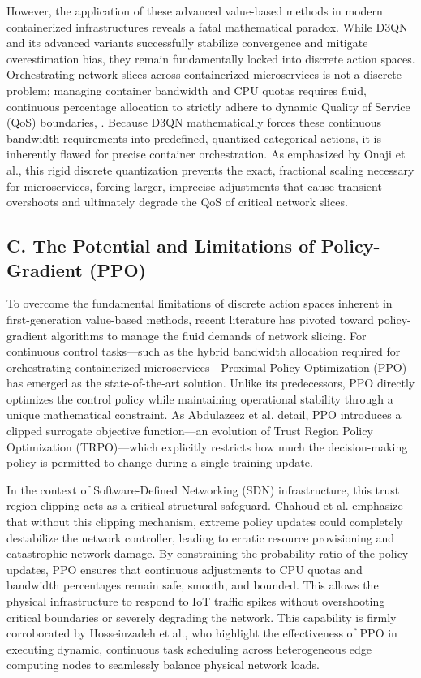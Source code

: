 \documentclass[conference]{IEEEtran}
\begin{document}
However, the application of these advanced value-based methods in modern containerized infrastructures reveals a fatal mathematical paradox. While D3QN and its advanced variants successfully stabilize convergence and mitigate overestimation bias, they remain fundamentally locked into discrete action spaces\cite{b13}. Orchestrating network slices across containerized microservices is not a discrete problem; managing container bandwidth and CPU quotas requires fluid, continuous percentage allocation to strictly adhere to dynamic Quality of Service (QoS) boundaries\cite{b6}, \cite{b35}. Because D3QN mathematically forces these continuous bandwidth requirements into predefined, quantized categorical actions, it is inherently flawed for precise container orchestration\cite{b6}. As emphasized by Onaji et al., this rigid discrete quantization prevents the exact, fractional scaling necessary for microservices, forcing larger, imprecise adjustments that cause transient overshoots and ultimately degrade the QoS of critical network slices\cite{b6}.

\subsection{C. The Potential and Limitations of Policy-Gradient (PPO)}\label{c.-the-potential-and-limitations-of-policy-gradient-ppo}

To overcome the fundamental limitations of discrete action spaces inherent in first-generation value-based methods, recent literature has pivoted toward policy-gradient algorithms to manage the fluid demands of network slicing. For continuous control tasks---such as the hybrid bandwidth allocation required for orchestrating containerized microservices---Proximal Policy Optimization (PPO) has emerged as the state-of-the-art solution. Unlike its predecessors, PPO directly optimizes the control policy while maintaining operational stability through a unique mathematical constraint. As Abdulazeez et al. detail, PPO introduces a clipped surrogate objective function---an evolution of Trust Region Policy Optimization (TRPO)---which explicitly restricts how much the decision-making policy is permitted to change during a single training update\cite{b36}.

In the context of Software-Defined Networking (SDN) infrastructure, this trust region clipping acts as a critical structural safeguard. Chahoud et al. emphasize that without this clipping mechanism, extreme policy updates could completely destabilize the network controller, leading to erratic resource provisioning and catastrophic network damage\cite{b18}. By constraining the probability ratio of the policy updates, PPO ensures that continuous adjustments to CPU quotas and bandwidth percentages remain safe, smooth, and bounded. This allows the physical infrastructure to respond to IoT traffic spikes without overshooting critical boundaries or severely degrading the network\cite{b18}. This capability is firmly corroborated by Hosseinzadeh et al., who highlight the effectiveness of PPO in executing dynamic, continuous task scheduling across heterogeneous edge computing nodes to seamlessly balance physical network loads\cite{b15}.
\end{document}
